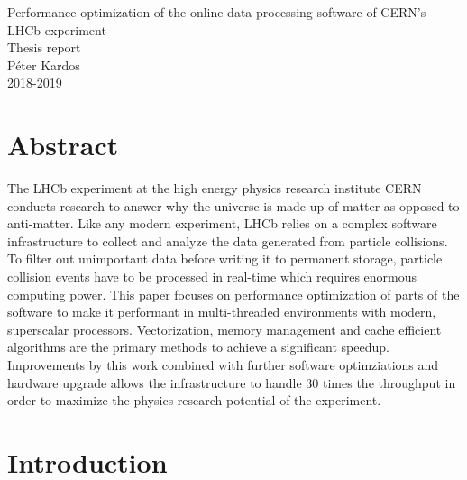 \documentclass[12pt]{article}
\begin{document}
\begin{center}
	\Huge Performance optimization of the online data processing software of CERN's LHCb experiment\\
	\Large Thesis report\\
	\vspace{1pc}
	\huge Péter Kardos \\
	\large 2018-2019
\end{center}


\section{Abstract}

The LHCb experiment at the high energy physics research institute CERN conducts research to answer why the universe is made up of matter as opposed to anti-matter. Like any modern experiment, LHCb relies on a complex software infrastructure to collect and analyze the data generated from particle collisions. To filter out unimportant data before writing it to permanent storage, particle collision events have to be processed in real-time which requires enormous computing power. This paper focuses on performance optimization of parts of the software to make it performant in multi-threaded environments with modern, superscalar processors. Vectorization, memory management and cache efficient algorithms are the primary methods to achieve a significant speedup. Improvements by this work combined with further software optimziations and hardware upgrade allows the infrastructure to handle 30 times the throughput in order to maximize the physics research potential of the experiment.


\newpage
\section{Introduction}\label{sec_intro}
\end{document}
